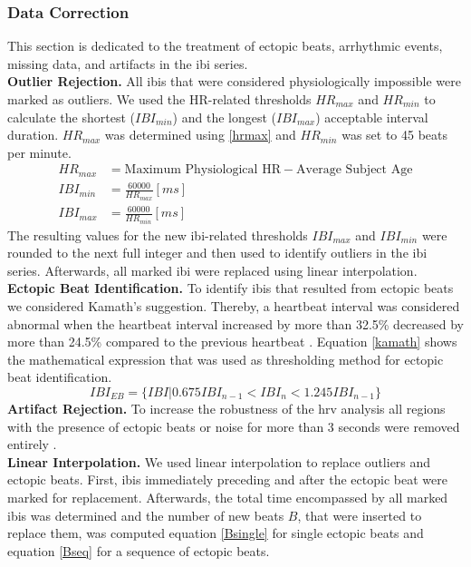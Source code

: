 \subsubsection{Data Correction}
This section is dedicated to the treatment of ectopic beats, arrhythmic events, missing data, and artifacts in the \gls{ibi} series. \\
\textbf{Outlier Rejection.} All \gls{ibi}s that were considered physiologically impossible were marked as outliers. We used the HR-related thresholds $HR_{max}$ and $HR_{min}$ to calculate the shortest ($IBI_{min}$) and the longest ($IBI_{max}$) acceptable interval duration. $HR_{max}$ was determined using \ref{hrmax} and $HR_{min}$ was set to 45 beats per minute.
\begin{align}\label{hrmax}
HR_{max} &= \text{Maximum Physiological HR} - \text{Average Subject Age}\\
IBI_{min} &= \frac{60000}{HR_{max}}	[ms]\\
IBI_{max} &= \frac{60000}{HR_{min}}	[ms]
\end{align}
The resulting values for the new \gls{ibi}-related thresholds $IBI_{max}$ and $IBI_{min}$ were rounded to the next full integer and then used to identify outliers in the \gls{ibi} series. Afterwards, all marked \gls{ibi} were replaced using linear interpolation.\\
\textbf{Ectopic Beat Identification.} To identify \gls{ibi}s that resulted from ectopic beats we considered Kamath's suggestion. Thereby, a heartbeat interval was considered abnormal when the heartbeat interval increased by more than 32.5\% decreased by more than 24.5\% compared to the previous heartbeat \cite{Choi2016}. Equation \ref{kamath} shows the mathematical expression that was used as thresholding method for ectopic beat identification. 
\begin{equation} \label{kamath}
IBI_{EB} = \lbrace IBI\vert 0.675 IBI_{n-1} < IBI_{n} < 1.245 IBI_{n-1}\rbrace  
\end{equation}
\textbf{Artifact Rejection.} To increase the robustness of the \gls{hrv} analysis all regions with the presence of ectopic beats or noise for more than 3 seconds were removed entirely \cite{Clifford2002}.\\
\textbf{Linear Interpolation.} We used linear interpolation to replace outliers and ectopic beats. First, \gls{ibi}s immediately preceding and after the ectopic beat were marked for replacement. Afterwards, the total time encompassed by all marked \gls{ibi}s was determined and the number of new beats $B$, that were inserted to replace them, was computed equation \ref{Bsingle} for single ectopic beats and equation \ref{Bseq} for a sequence of ectopic beats.
